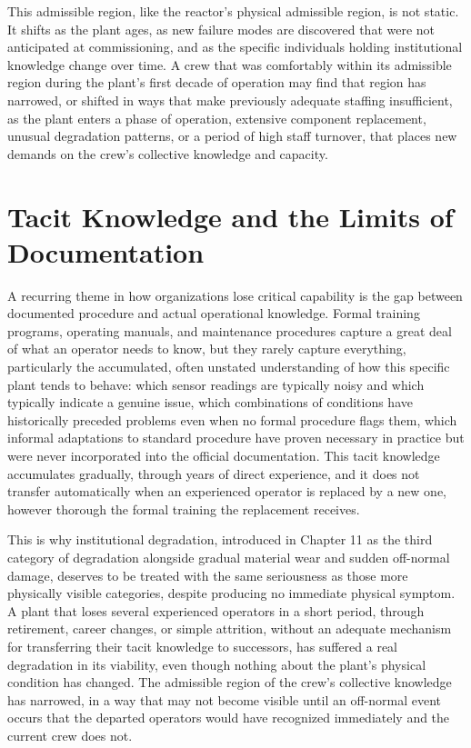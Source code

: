 This admissible region, like the reactor's physical admissible region, is not static. It shifts as the plant ages, as new failure modes are discovered that were not anticipated at commissioning, and as the specific individuals holding institutional knowledge change over time. A crew that was comfortably within its admissible region during the plant's first decade of operation may find that region has narrowed, or shifted in ways that make previously adequate staffing insufficient, as the plant enters a phase of operation, extensive component replacement, unusual degradation patterns, or a period of high staff turnover, that places new demands on the crew's collective knowledge and capacity.

\section{Tacit Knowledge and the Limits of Documentation}

A recurring theme in how organizations lose critical capability is the gap between documented procedure and actual operational knowledge. Formal training programs, operating manuals, and maintenance procedures capture a great deal of what an operator needs to know, but they rarely capture everything, particularly the accumulated, often unstated understanding of how this specific plant tends to behave: which sensor readings are typically noisy and which typically indicate a genuine issue, which combinations of conditions have historically preceded problems even when no formal procedure flags them, which informal adaptations to standard procedure have proven necessary in practice but were never incorporated into the official documentation. This tacit knowledge accumulates gradually, through years of direct experience, and it does not transfer automatically when an experienced operator is replaced by a new one, however thorough the formal training the replacement receives.

This is why institutional degradation, introduced in Chapter 11 as the third category of degradation alongside gradual material wear and sudden off-normal damage, deserves to be treated with the same seriousness as those more physically visible categories, despite producing no immediate physical symptom. A plant that loses several experienced operators in a short period, through retirement, career changes, or simple attrition, without an adequate mechanism for transferring their tacit knowledge to successors, has suffered a real degradation in its viability, even though nothing about the plant's physical condition has changed. The admissible region of the crew's collective knowledge has narrowed, in a way that may not become visible until an off-normal event occurs that the departed operators would have recognized immediately and the current crew does not.

